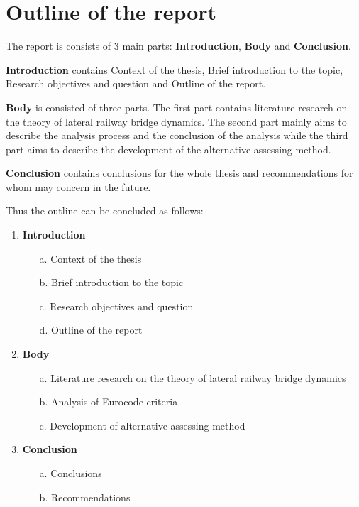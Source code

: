 \section{Outline of the report}
The report is consists of 3 main parts: \textbf{Introduction}, \textbf{Body} and \textbf{Conclusion}.

\textbf{Introduction} contains Context of the thesis, Brief introduction to the topic, Research objectives and question and Outline of the report.

\textbf{Body} is consisted of three parts. The first part contains literature research on the theory of lateral railway bridge dynamics. The second part mainly aims to describe the analysis process and the conclusion of the analysis while the third part aims to describe the development of the alternative assessing method.

\textbf{Conclusion} contains conclusions for the whole thesis and recommendations for whom may concern in the future. 

Thus the outline can be concluded as follows:

\begin{enumerate}
    \item \textbf{Introduction}
    \begin{enumerate}
        \item[a.] Context of the thesis
        \item[b.] Brief introduction to the topic
        \item[c.] Research objectives and question
        \item[d.] Outline of the report
    \end{enumerate}
    \item \textbf{Body}
    \begin{enumerate}
        \item[a.] Literature research on the theory of lateral railway bridge dynamics
        \item[b.] Analysis of Eurocode criteria
        \item[c.] Development of alternative assessing method 
    \end{enumerate}
    \item \textbf{Conclusion}
    \begin{enumerate}
        \item[a.] Conclusions
        \item[b.] Recommendations
    \end{enumerate} 
\end{enumerate}